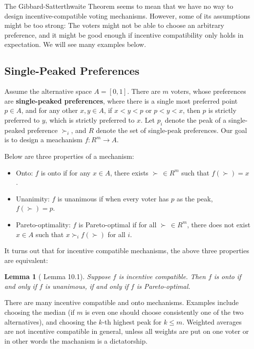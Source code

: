 \documentclass[openany]{book}
\newtheorem{lemma}{Lemma}[chapter]
\theoremstyle{remark}
\begin{document}
The Gibbard-Satterthwaite Theorem seems to mean that we have no way to design incentive-compatible voting mechanisms. However, some of its assumptions might be too strong: The voters might not be able to choose an arbitrary preference, and it might be good enough if incentive compatibility only holds in expectation. We will see many examples below.

\subsection{Single-Peaked Preferences}
Assume the alternative space $A=[0,1]$. There are $m$ voters, whose preferences are \textbf{single-peaked preferences}, where there is a single most preferred point $p\in A$, and for any other $x,y\in A$, if $x<y<p$ or $p<y<x$, then $p$ is strictly preferred to $y$, which is strictly preferred to $x$. Let $p_i$ denote the peak of a single-peaked preference $\succ_i$, and $R$ denote the set of single-peak preferences. Our goal is to design a meachanism $f:R^m\to A$.

Below are three properties of a mechanism:
\begin{itemize}
    \item Onto: $f$ is onto if for any $x\in A$, there exists $\succ\,\in R^m$ such that $f(\succ)=x$.
    \item Unanimity: $f$ is unanimous if when every voter has $p$ as the peak, $f(\succ)=p$.
    \item Pareto-optimality: $f$ is Pareto-optimal if for all $\succ\,\in R^m$, there does not exist $x\in A$ such that $x\succ_if(\succ)$ for all $i$.
\end{itemize}
It turns out that for incentive compatible mechanisms, the above three properties are equivalent:
\begin{lemma}[\cite{NRTV07} Lemma 10.1]
    Suppose $f$ is incentive compatible. Then $f$ is onto if and only if $f$ is unanimous, if and only if $f$ is Pareto-optimal.
\end{lemma}

There are many incentive compatible and onto mechanisms. Examples include choosing the median (if $m$ is even one should choose consistently one of the two alternatives), and choosing the $k$-th highest peak for $k\le m$. Weighted averages are not incentive compatible in general, unless all weights are put on one voter or in other words the machanism is a dictatorship.
\end{document}

